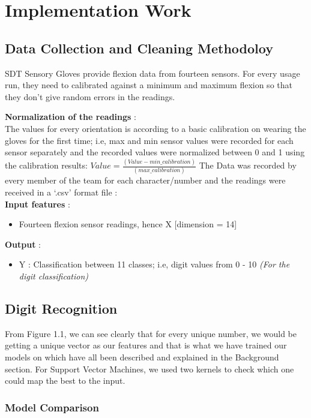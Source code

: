 \chapter{Implementation Work}

\label{ch:conclusions}

\section{Data Collection and Cleaning Methodoloy}

SDT Sensory Gloves  provide flexion data from fourteen sensors. For every usage run, they need to calibrated against a minimum and maximum flexion so that they don't give random errors in the readings.

\textbf{Normalization of the readings} :\\
The values for every orientation is according to a basic calibration on wearing the gloves for the first time; i.e, max and min sensor values were recorded for each sensor separately and the recorded values were normalized between 0 and 1 using the calibration results:
\vskip 2mm
$
Value = \frac{(Value - min\_calibration)}{(max\_calibration)}
$
\vskip 2mm
The Data was recorded by every member of the team for each character/number and the readings were received in a ‘.csv’ format file :\\
\textbf{Input features} : \begin{itemize}\item Fourteen flexion sensor readings, hence X [dimension = 14]\end{itemize}
\textbf{Output} :\begin{itemize}\item Y : Classification between 11 classes; i.e, digit values from 0 - 10 \textit{(For the digit classification)}\end{itemize}


\section{Digit Recognition}

From Figure 1.1, we can see clearly that for every unique number, we would be getting a unique vector as our features and that is what we have trained our models on which have all been described and explained in the Background section. For Support Vector Machines, we used two kernels to check which one could map the best to the input.

\subsection{Model Comparison}


